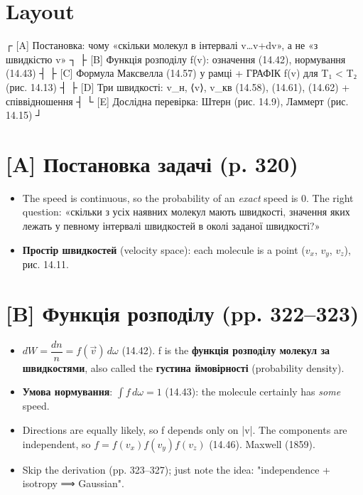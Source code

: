 \documentclass[11pt,a4paper,oneside]{book}
\begin{document}
\section*{Layout}
\begin{layout}
┌ [A] Постановка: чому «скільки молекул в інтервалі v…v+dv», а не «з швидкістю v» ┐
├ [B] Функція розподілу f(v): означення (14.42), нормування (14.43)               ┤
├ [C] Формула Максвелла (14.57) у рамці + ГРАФІК f(v) для T₁ < T₂ (рис. 14.13)      ┤
├ [D] Три швидкості: v_н, ⟨v⟩, v_кв (14.58), (14.61), (14.62) + співвідношення     ┤
└ [E] Дослідна перевірка: Штерн (рис. 14.9), Ламмерт (рис. 14.15)                  ┘
\end{layout}

\section*{[A] Постановка задачі (p. 320)}
\begin{itemize}
\item The speed is continuous, so the probability of an \textit{exact} speed is 0. The right question: «скільки з усіх наявних молекул мають швидкості, значення яких лежать у певному інтервалі швидкостей в околі заданої швидкості?»
\item \textbf{Простір швидкостей} (velocity space): each molecule is a point ($v_{x}$, $v_{y}$, $v_{z}$), рис. 14.11.
\end{itemize}

\section*{[B] Функція розподілу (pp. 322–323)}
\begin{itemize}
\item $dW = \dfrac{dn}{n} = f(\vec v)\,d\omega$ (14.42). f is the \textbf{функція розподілу молекул за швидкостями}, also called the \textbf{густина ймовірності} (probability density).
\item \textbf{Умова нормування}: $\int f\,d\omega = 1$ (14.43): the molecule certainly has \textit{some} speed.
\item Directions are equally likely, so f depends only on |v|. The components are independent, so $f = f(v_x)f(v_y)f(v_z)$ (14.46). Maxwell (1859).
\item Skip the derivation (pp. 323–327); just note the idea: "independence + isotropy ⟹ Gaussian".
\end{itemize}
\end{document}
